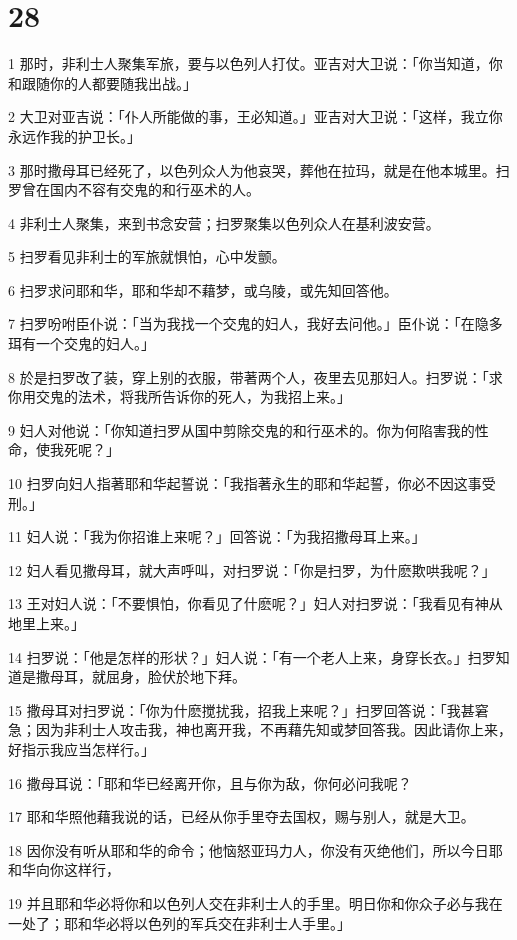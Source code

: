 \chapter{28}

\par 1 那时，非利士人聚集军旅，要与以色列人打仗。亚吉对大卫说：「你当知道，你和跟随你的人都要随我出战。」
\par 2 大卫对亚吉说：「仆人所能做的事，王必知道。」亚吉对大卫说：「这样，我立你永远作我的护卫长。」
\par 3 那时撒母耳已经死了，以色列众人为他哀哭，葬他在拉玛，就是在他本城里。扫罗曾在国内不容有交鬼的和行巫术的人。
\par 4 非利士人聚集，来到书念安营；扫罗聚集以色列众人在基利波安营。
\par 5 扫罗看见非利士的军旅就惧怕，心中发颤。
\par 6 扫罗求问耶和华，耶和华却不藉梦，或乌陵，或先知回答他。
\par 7 扫罗吩咐臣仆说：「当为我找一个交鬼的妇人，我好去问他。」臣仆说：「在隐多珥有一个交鬼的妇人。」
\par 8 於是扫罗改了装，穿上别的衣服，带著两个人，夜里去见那妇人。扫罗说：「求你用交鬼的法术，将我所告诉你的死人，为我招上来。」
\par 9 妇人对他说：「你知道扫罗从国中剪除交鬼的和行巫术的。你为何陷害我的性命，使我死呢？」
\par 10 扫罗向妇人指著耶和华起誓说：「我指著永生的耶和华起誓，你必不因这事受刑。」
\par 11 妇人说：「我为你招谁上来呢？」回答说：「为我招撒母耳上来。」
\par 12 妇人看见撒母耳，就大声呼叫，对扫罗说：「你是扫罗，为什麽欺哄我呢？」
\par 13 王对妇人说：「不要惧怕，你看见了什麽呢？」妇人对扫罗说：「我看见有神从地里上来。」
\par 14 扫罗说：「他是怎样的形状？」妇人说：「有一个老人上来，身穿长衣。」扫罗知道是撒母耳，就屈身，脸伏於地下拜。
\par 15 撒母耳对扫罗说：「你为什麽搅扰我，招我上来呢？」扫罗回答说：「我甚窘急；因为非利士人攻击我，神也离开我，不再藉先知或梦回答我。因此请你上来，好指示我应当怎样行。」
\par 16 撒母耳说：「耶和华已经离开你，且与你为敌，你何必问我呢？
\par 17 耶和华照他藉我说的话，已经从你手里夺去国权，赐与别人，就是大卫。
\par 18 因你没有听从耶和华的命令；他恼怒亚玛力人，你没有灭绝他们，所以今日耶和华向你这样行，
\par 19 并且耶和华必将你和以色列人交在非利士人的手里。明日你和你众子必与我在一处了；耶和华必将以色列的军兵交在非利士人手里。」
